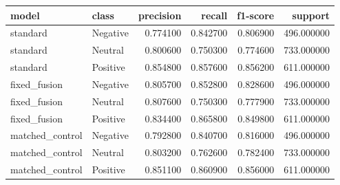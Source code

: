 \begin{tabular}{llrrrr}
\toprule
model & class & precision & recall & f1-score & support \\
\midrule
standard & Negative & 0.774100 & 0.842700 & 0.806900 & 496.000000 \\
standard & Neutral & 0.800600 & 0.750300 & 0.774600 & 733.000000 \\
standard & Positive & 0.854800 & 0.857600 & 0.856200 & 611.000000 \\
fixed\_fusion & Negative & 0.805700 & 0.852800 & 0.828600 & 496.000000 \\
fixed\_fusion & Neutral & 0.807600 & 0.750300 & 0.777900 & 733.000000 \\
fixed\_fusion & Positive & 0.834400 & 0.865800 & 0.849800 & 611.000000 \\
matched\_control & Negative & 0.792800 & 0.840700 & 0.816000 & 496.000000 \\
matched\_control & Neutral & 0.803200 & 0.762600 & 0.782400 & 733.000000 \\
matched\_control & Positive & 0.851100 & 0.860900 & 0.856000 & 611.000000 \\
\bottomrule
\end{tabular}
